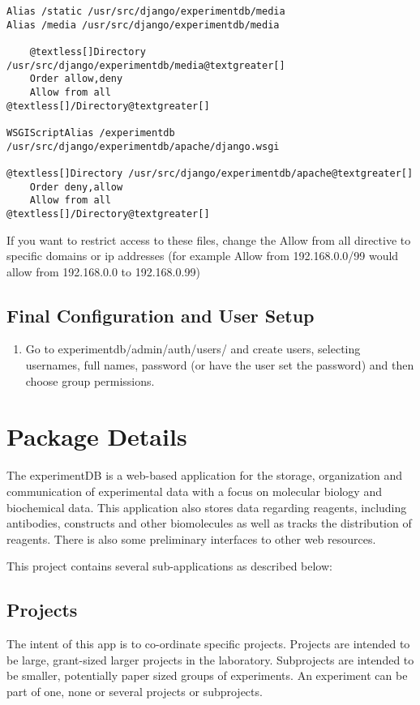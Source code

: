 \documentclass[letterpaper,10pt,english]{sphinxmanual}
\begin{document}
\begin{Verbatim}[commandchars=@\[\]]
Alias /static /usr/src/django/experimentdb/media
Alias /media /usr/src/django/experimentdb/media

    @textless[]Directory /usr/src/django/experimentdb/media@textgreater[]
    Order allow,deny
    Allow from all
@textless[]/Directory@textgreater[]

WSGIScriptAlias /experimentdb /usr/src/django/experimentdb/apache/django.wsgi

@textless[]Directory /usr/src/django/experimentdb/apache@textgreater[]
    Order deny,allow
    Allow from all
@textless[]/Directory@textgreater[]
\end{Verbatim}

If you want to restrict access to these files, change the Allow from all directive to specific domains or ip addresses (for example Allow from 192.168.0.0/99 would allow from 192.168.0.0 to 192.168.0.99)


\section{Final Configuration and User Setup}
\label{installation:final-configuration-and-user-setup}\begin{enumerate}
\item {} 
Go to experimentdb/admin/auth/users/ and create users, selecting usernames, full names, password (or have the user set the password) and then choose group permissions.

\end{enumerate}


\chapter{Package Details}
\label{api:module-experimentdb}\label{api:package-details}\label{api::doc}
The experimentDB is a web-based application for the storage, organization and communication of experimental data with a focus on molecular biology and biochemical data. This application also stores data regarding reagents, including antibodies, constructs and other biomolecules as well as tracks the distribution of reagents. There is also some preliminary interfaces to other web resources.

This project contains several sub-applications as described below:


\section{Projects}
\label{api:projects}
The intent of this app is to co-ordinate specific projects. Projects are intended to be large, grant-sized larger projects in the laboratory. Subprojects are intended to be smaller, potentially paper sized groups of experiments.  An experiment can be part of one, none or several projects or subprojects.
\end{document}
